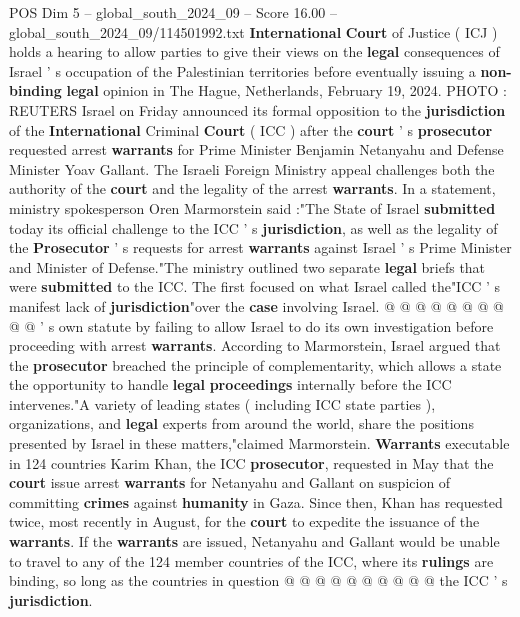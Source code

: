 \begin{textsample}{POS Dim 5 – global\_south\_2024\_09 – Score 16.00 – global\_south\_2024\_09/114501992.txt}  \label{ex:f5_pos_232}
\textbf{International} \textbf{Court} of Justice ( ICJ ) holds a hearing to allow parties to give their views on the \textbf{legal} consequences of Israel ' s occupation of the Palestinian territories before eventually issuing a \textbf{non-binding} \textbf{legal} opinion in The Hague, Netherlands, February 19, 2024.
PHOTO : REUTERS Israel on Friday announced its formal opposition to the \textbf{jurisdiction} of the \textbf{International} Criminal \textbf{Court} ( ICC ) after the \textbf{court} ' s \textbf{prosecutor} requested arrest \textbf{warrants} for Prime Minister Benjamin Netanyahu and Defense Minister Yoav Gallant.
The Israeli Foreign Ministry appeal challenges both the authority of the \textbf{court} and the legality of the arrest \textbf{warrants}.
In a statement, ministry spokesperson Oren Marmorstein said :"The State of Israel \textbf{submitted} today its official challenge to the ICC ' s \textbf{jurisdiction}, as well as the legality of the \textbf{Prosecutor} ' s requests for arrest \textbf{warrants} against Israel ' s Prime Minister and Minister of Defense."The ministry outlined two separate \textbf{legal} briefs that were \textbf{submitted} to the ICC.
The first focused on what Israel called the"ICC ' s manifest lack of \textbf{jurisdiction}"over the \textbf{case} involving Israel. @ @ @ @ @ @ @ @ @ @ ' s own statute by failing to allow Israel to do its own investigation before proceeding with arrest \textbf{warrants}.
According to Marmorstein, Israel argued that the \textbf{prosecutor} breached the principle of complementarity, which allows a state the opportunity to handle \textbf{legal} \textbf{proceedings} internally before the ICC intervenes."A variety of leading states ( including ICC state parties ), organizations, and \textbf{legal} experts from around the world, share the positions presented by Israel in these matters,"claimed Marmorstein. \textbf{Warrants} executable in 124 countries Karim Khan, the ICC \textbf{prosecutor}, requested in May that the \textbf{court} issue arrest \textbf{warrants} for Netanyahu and Gallant on suspicion of committing \textbf{crimes} against \textbf{humanity} in Gaza.
Since then, Khan has requested twice, most recently in August, for the \textbf{court} to expedite the issuance of the \textbf{warrants}.
If the \textbf{warrants} are issued, Netanyahu and Gallant would be unable to travel to any of the 124 member countries of the ICC, where its \textbf{rulings} are binding, so long as the countries in question @ @ @ @ @ @ @ @ @ @ the ICC ' s \textbf{jurisdiction}.

\end{textsample}
